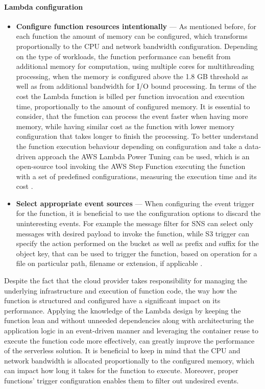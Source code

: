 \paragraph{Lambda configuration}

\begin{itemize}
   \item \textbf{Configure function resources intentionally} --- As mentioned before, for each function the amount of memory can be configured, which transforms proportionally to the CPU and network bandwidth configuration.
   Depending on the type of workloads, the function performance can benefit from additional memory for computation, using multiple cores for multithreading processing, when the memory is configured above the 1.8 GB threshold as well as from additional bandwidth for I/O bound processing.
   In terms of the cost the Lambda function is billed per function invocation and execution time, proportionally to the amount of configured memory.
   It is essential to consider, that the function can process the event faster when having more memory, while having similar cost as the function with lower memory configuration that takes longer to finish the processing.
   To better understand the function execution behaviour depending on configuration and take a data-driven approach the AWS Lambda Power Tuning can be used, which is an open-source tool invoking the AWS Step Function executing the function with a set of predefined configurations, measuring the execution time and its cost \cite{BecomeAServerlessBlackBelt}.
   \item \textbf{Select appropriate event sources} --- When configuring the event trigger for the function, it is beneficial to use the configuration options to discard the uninteresting events. For example the message filter for SNS can select only messages with desired payload to invoke the function, while S3 trigger can specify the action performed on the bucket as well as prefix and suffix for the object key, that can be used to trigger the function, based on operation for a file on particular path, filename or extension, if applicable \cite{BecomeAServerlessBlackBelt}.
\end{itemize}

Despite the fact that the cloud provider takes responsibility for managing the underlying infrastructure and execution of function code, the way how the function is structured and configured have a significant impact on its performance.
Applying the knowledge of the Lambda design by keeping the function lean and without unneeded dependencies along with architecturing the application logic in an event-driven manner and leveraging the container reuse to execute the function code more effectively, can greatly improve the performance of the serverless solution.
It is beneficial to keep in mind that the CPU and network bandwidth is allocated proportionally to the configured memory, which can impact how long it takes for the function to execute.
Moreover, proper functions’ trigger configuration enables them to filter out undesired events.

